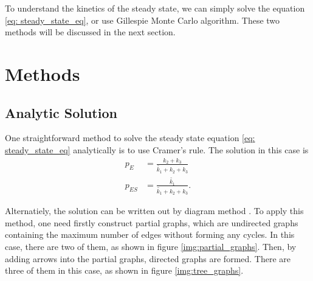 	To understand the kinetics of the steady state, we can simply solve the equation \eqref{eq: steady_state_eq}, or use Gillespie Monte Carlo algorithm. These two methods will be discussed in the next section.

\section{Methods}
	\subsection{Analytic Solution}
		One straightforward method to solve the steady state equation \eqref{eq: steady_state_eq} analytically is to use Cramer's rule. The solution in this case is
		\begin{equation}
			\begin{aligned}
				p_E &= \frac{k_2+k_3}{\widetilde{k_1}+k_2+k_3}\\
				p_{ES} &= \frac{\widetilde{k_1}}{\widetilde{k_1}+k_2+k_3}.
			\end{aligned}
			\label{eq:state_prob}
		\end{equation}

		Alternatiely, the solution can be written out by diagram method \cite{hill2004}. To apply this method, one need firstly construct partial graphs, which are undirected graphs containing the maximum number of edges without forming any cycles. In this case, there are two of them, as shown in figure \ref{img:partial_graphs}. Then, by adding arrows into the partial graphs, directed graphs are formed. There are three of them in this case, as shown in figure \ref{img:tree_graphs}.

